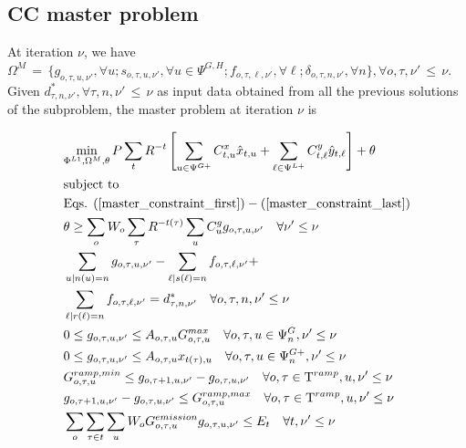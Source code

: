 \documentclass[final]{IEEEtran}
\newcommand{\myeq}{\,{=}\,}
\newcommand{\myleq}{\,{\leq}\,}
\newcommand{\Tau}{\mathrm{T}}
\begin{document}
\subsection{CC master problem}

At iteration $\nu$, we have \( \Omega^{M} \myeq \{ g_{o, \tau, u, \nu'}, \forall u; s_{o, \tau, u, \nu'}, \forall u \in \Psi^{G, H}; f_{o, \tau, \ell, \nu'}, \forall \ell; \delta_{o, \tau, n, \nu'}, \forall n \}, \forall o, \tau, \nu' \myleq \nu \). Given \( d_{\tau, n, \nu'}^*, \forall \tau, n, \nu' \myleq \nu \) as input data obtained from all the previous solutions of the subproblem, the master problem at iteration $\nu$ is

\begin{align}
&\label{master_obj} \underset{\Phi^{L1}, \Omega^{M}, \theta}{\text{min}} \, P \sum\limits_{t} R^{-t} \left[ \sum\limits_{u \in \Psi^{G+}} C^x_{t, u} \hat{x}_{t, u} + \sum\limits_{\ell \in \Psi^{L+}} C^y_{t, \ell} \hat{y}_{t, \ell} \right] + \theta \\
&\text{subject to} \nonumber \\
&\text{Eqs. } (\ref{master_constraint_first}) - (\ref{master_constraint_last}) \\
&\theta \geq \sum\limits_o W_o \sum\limits_{\tau} R^{-t(\tau)} \sum\limits_{u} C_{u}^g g_{o, \tau, u, \nu'} \quad \forall \nu' \leq \nu \\
&\sum\limits_{u | n(u) = n} g_{o, \tau, u, \nu'} - \sum\limits_{\ell | s(\ell) = n} f_{o, \tau, \ell, \nu'} + \nonumber \\
&\sum\limits_{\ell | r(\ell) = n} f_{o, \tau, \ell, \nu'} = d_{\tau, n, \nu'}^* \quad \forall o, \tau, n, \nu' \leq \nu \\
&0 \leq g_{o, \tau, u, \nu'} \leq A_{o, \tau, u} G_{o, \tau, u}^{max} \quad \forall o, \tau, u \in \Psi_n^G, \nu' \leq \nu \\
&0 \leq g_{o, \tau, u, \nu'} \leq A_{o, \tau, u} x_{t(\tau), u} \quad \forall o, \tau, u \in \Psi_n^{G+}, \nu' \leq \nu \\
&G^{ramp,min}_{o, \tau, u} \leq g_{o, \tau + 1, u, \nu'} - g_{o, \tau, u, \nu'} \quad \forall o, \tau \in \Tau^{ramp}, u, \nu' \leq \nu \\
&g_{o, \tau + 1, u, \nu'} - g_{o, \tau, u, \nu'} \leq G^{ramp,max}_{o, \tau, u} \quad \forall o, \tau \in \Tau^{ramp}, u, \nu' \leq \nu \\
&\sum\limits_{o} \sum\limits_{\tau \in t} \sum\limits_{u} W_o G^{emission}_{o, \tau, u} g_{o, \tau, u, \nu'}  \leq E_{t} \quad \forall t, \nu' \leq \nu \\

\end{align}
\end{document}
